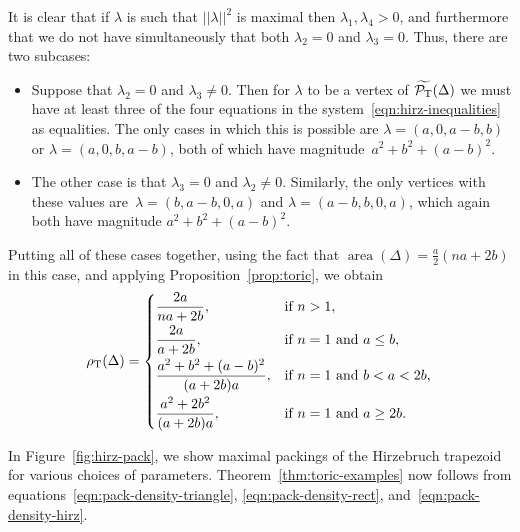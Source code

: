 \documentclass[pdftex]{sigma}
\numberwithin{equation}{section}
\newcommand{\De}{\Delta}
\newcommand{\area}{\operatorname{area}}
\newcommand{\PT}{\mathcal{P}_{\rm T}}
\newcommand{\PTtilde}{\widetilde{\PT}}
\begin{document}
It is clear that if $\lambda$ is such that $||\lambda||^2$ is maximal then $\lambda_1, \lambda_4>0$, and furthermore that we do not have simultaneously that both $\lambda_2=0$ and $\lambda_3=0$.
Thus, there are two subcases:
\begin{itemize}\itemsep=0pt
 \item Suppose that $\lambda_2=0$ and $\lambda_3\neq 0$.
Then for $\lambda$ to be a vertex of $\PTtilde(\De)$ we must have at least three of the four equations in the system~\eqref{eqn:hirz-inequalities} as equalities.
The only cases in which this is possible are $\lambda = (a,0,a-b,b)$ or $\lambda = (a,0,b,a-b)$, both of which have magnitude~$a^2+b^2+(a-b)^2$.

\item The other case is that $\lambda_3=0$ and $\lambda_2\neq 0$. Similarly, the only vertices with these values are~$\lambda = (b, a-b, 0, a)$ and $\lambda = (a-b, b, 0, a)$, which again both have magnitude $a^2+b^2+(a-b)^2$.
\end{itemize}

Putting all of these cases together, using the fact that $\area(\De) = \frac{a}{2}(na+2b)$ in this case, and applying Proposition~\ref{prop:toric}, we obtain
\begin{equation}\label{eqn:pack-density-hirz}
 \rho_{{\rm T}}(\De) = \begin{cases}
 \dfrac{2a}{na+2b}, & \textrm{if }n>1,\vspace{1mm}\\
 \dfrac{2a}{a+2b}, & \textrm{if }n=1 \textrm{ and }a\leq b,\vspace{1mm}\\
 \dfrac{a^2+b^2+ (a-b)^2}{(a+2b)a}, & \textrm{if }n=1 \textrm{ and } b<a<2b,\vspace{1mm}\\
 \dfrac{a^2+2b^2}{(a+2b)a}, & \textrm{if }n=1 \textrm{ and } a \geq 2b. \end{cases}
\end{equation}

In Figure~\ref{fig:hirz-pack}, we show maximal packings of the Hirzebruch trapezoid for various choices of parameters.
Theorem~\ref{thm:toric-examples} now follows from equations~\eqref{eqn:pack-density-triangle}, \eqref{eqn:pack-density-rect}, and~\eqref{eqn:pack-density-hirz}.
\end{document}
